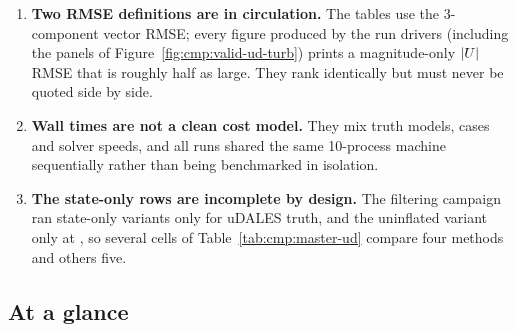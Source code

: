 \begin{enumerate}[nosep,leftmargin=1.6em]
        methods should be read from Figure~\ref{fig:cmp:calibration}.
  \item \textbf{Two RMSE definitions are in circulation.} The tables use the
        3-component vector RMSE; every figure produced by the run drivers
        (including the panels of Figure~\ref{fig:cmp:valid-ud-turb}) prints a
        magnitude-only $|U|$ RMSE that is roughly half as large. They rank
        identically but must never be quoted side by side.
  \item \textbf{Wall times are not a clean cost model.} They mix truth models,
        cases and solver speeds, and all runs shared the same 10-process
        machine sequentially rather than being benchmarked in isolation.
  \item \textbf{The state-only rows are incomplete by design.} The filtering
        campaign ran state-only variants only for uDALES truth, and the
        uninflated variant only at , so several cells of
        Table~\ref{tab:cmp:master-ud} compare four methods and others five.
\end{enumerate}

\subsection{At a glance}
\label{sec:cmp:glance}

